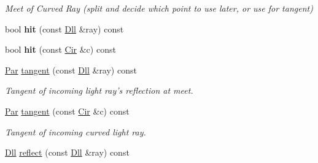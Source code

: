 \begin{DoxyCompactItemize}
\begin{DoxyCompactList}\small\item\em Meet of Curved Ray (split and decide which point to use later, or use for tangent) \end{DoxyCompactList}\item 
\hypertarget{structvsr_1_1_opt_surf_aa6265683f19cb376ce0ada53fd234b88}{bool {\bfseries hit} (const \hyperlink{namespacevsr_a6c6892b7aec25cfb16492501e2e35b11}{Dll} \&ray) const }\label{structvsr_1_1_opt_surf_aa6265683f19cb376ce0ada53fd234b88}

\item 
\hypertarget{structvsr_1_1_opt_surf_a5e06442ee763a8e684f180e6449dddff}{bool {\bfseries hit} (const \hyperlink{namespacevsr_a2744605aa828e495fc85463b7ae0d045}{Cir} \&c) const }\label{structvsr_1_1_opt_surf_a5e06442ee763a8e684f180e6449dddff}

\item 
\hypertarget{structvsr_1_1_opt_surf_a7b27b03b9ca9d11508e7ff9b1f405cff}{\hyperlink{namespacevsr_ae046793ece205351429a6346a66fd6eb}{Par} \hyperlink{structvsr_1_1_opt_surf_a7b27b03b9ca9d11508e7ff9b1f405cff}{tangent} (const \hyperlink{namespacevsr_a6c6892b7aec25cfb16492501e2e35b11}{Dll} \&ray) const }\label{structvsr_1_1_opt_surf_a7b27b03b9ca9d11508e7ff9b1f405cff}

\begin{DoxyCompactList}\small\item\em Tangent of incoming light ray's reflection at meet. \end{DoxyCompactList}\item 
\hypertarget{structvsr_1_1_opt_surf_a4e8d4d9622c5f6227a6f0e1dab8179b7}{\hyperlink{namespacevsr_ae046793ece205351429a6346a66fd6eb}{Par} \hyperlink{structvsr_1_1_opt_surf_a4e8d4d9622c5f6227a6f0e1dab8179b7}{tangent} (const \hyperlink{namespacevsr_a2744605aa828e495fc85463b7ae0d045}{Cir} \&c) const }\label{structvsr_1_1_opt_surf_a4e8d4d9622c5f6227a6f0e1dab8179b7}

\begin{DoxyCompactList}\small\item\em Tangent of incoming curved light ray. \end{DoxyCompactList}\item 
\hypertarget{structvsr_1_1_opt_surf_a54b0e6f5e7d01e34b674519633d444db}{\hyperlink{namespacevsr_a6c6892b7aec25cfb16492501e2e35b11}{Dll} \hyperlink{structvsr_1_1_opt_surf_a54b0e6f5e7d01e34b674519633d444db}{reflect} (const \hyperlink{namespacevsr_a6c6892b7aec25cfb16492501e2e35b11}{Dll} \&ray) const }\label{structvsr_1_1_opt_surf_a54b0e6f5e7d01e34b674519633d444db}


\end{DoxyCompactItemize}
